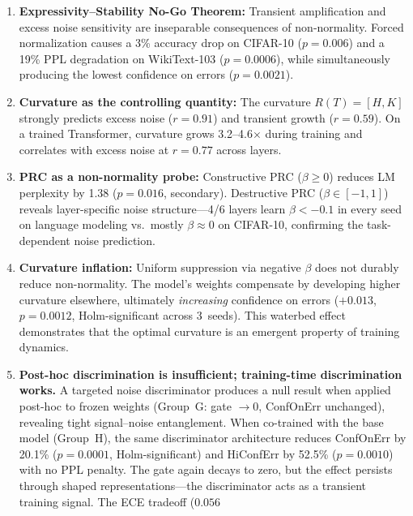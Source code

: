 \documentclass[11pt,a4paper]{article}
\theoremstyle{definition}
\begin{document}
\begin{enumerate}[nosep]
  \item \textbf{Expressivity--Stability No-Go Theorem:} Transient
        amplification and excess noise sensitivity are inseparable
        consequences of non-normality. Forced normalization causes
        a 3\% accuracy drop on CIFAR-10 ($p = 0.006$) and a 19\%
        PPL degradation on WikiText-103 ($p = 0.0006$), while
        simultaneously producing the lowest confidence on errors
        ($p = 0.0021$).
  \item \textbf{Curvature as the controlling quantity:} The curvature
        $R(T) = [H,K]$ strongly predicts excess noise ($r = 0.91$)
        and transient growth ($r = 0.59$). On a trained Transformer,
        curvature grows 3.2--4.6$\times$ during training and
        correlates with excess noise at $r = 0.77$ across layers.
  \item \textbf{PRC as a non-normality probe:} Constructive PRC
        ($\beta \geq 0$) reduces LM perplexity by 1.38
        ($p = 0.016$, secondary). Destructive PRC
        ($\beta \in [-1,1]$) reveals layer-specific noise
        structure---4/6 layers learn $\beta < -0.1$ in every seed
        on language modeling vs.\ mostly $\beta \approx 0$ on
        CIFAR-10, confirming the task-dependent noise prediction.
  \item \textbf{Curvature inflation:} Uniform suppression via
        negative $\beta$ does not durably reduce non-normality.
        The model's weights compensate by developing higher
        curvature elsewhere, ultimately \emph{increasing}
        confidence on errors ($+0.013$, $p = 0.0012$,
        Holm-significant across 3~seeds). This waterbed effect
        demonstrates that the optimal curvature is an emergent
        property of training dynamics.
  \item \textbf{Post-hoc discrimination is insufficient; training-time
        discrimination works.} A targeted noise discriminator produces
        a null result when applied post-hoc to frozen weights
        (Group~G: gate $\to 0$, ConfOnErr unchanged), revealing tight
        signal--noise entanglement. When co-trained with the base
        model (Group~H), the same discriminator architecture reduces
        ConfOnErr by 20.1\% ($p = 0.0001$, Holm-significant) and
        HiConfErr by 52.5\% ($p = 0.0010$) with no PPL penalty.
        The gate again decays to zero, but the effect persists
        through shaped representations---the discriminator acts as
        a transient training signal. The ECE tradeoff ($0.056$

\end{enumerate}
\end{document}

